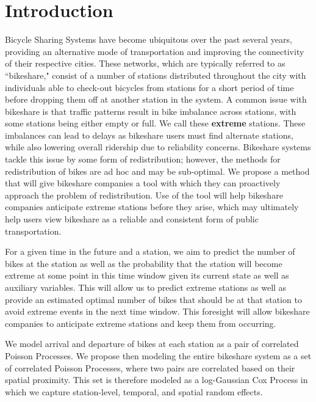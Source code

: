 \documentclass{acm_proc_article-sp}
\begin{document}

\section{Introduction}

Bicycle Sharing Systems have become ubiquitous over the past several years, providing an alternative mode of transportation and improving the connectivity of their respective cities.  These networks, which are typically referred to as ``bikeshare," consist of a number of stations distributed throughout the city with individuals able to check-out bicycles from stations for a short period of time before dropping them off at another station in the system.  A common issue with bikeshare is that traffic patterns result in bike imbalance across stations, with some stations being either empty or full.  We call these {\bf extreme} stations. These imbalances can lead to delays as bikeshare users must find alternate stations, while also lowering overall ridership due to reliability concerns. Bikeshare systems tackle this issue by some form of redistribution; however, the methods for redistribution of bikes are ad hoc and may be sub-optimal. We propose a method that will give bikeshare companies a tool with which they can proactively approach the problem of redistribution. Use of the tool will help bikeshare companies anticipate extreme stations before they arise, which may ultimately help users view bikeshare as a reliable and consistent form of public transportation.

For a given time in the future and a station, we aim to predict the number of bikes at the station as well as the probability that the station will become extreme at some point in this time window given its current state as well as auxiliary variables.  This will allow us to predict extreme stations as well as provide an estimated optimal number of bikes that should be at that station to avoid extreme events in the next time window. This foresight will allow bikeshare companies to anticipate extreme stations and keep them from occurring.

We model arrival and departure of bikes at each station as a pair of correlated Poisson Processes.  We propose then modeling the entire bikeshare system as a set of correlated Poisson Processes, where two pairs are correlated based on their spatial proximity.  This set is therefore modeled as a log-Gaussian Cox Process in which we capture station-level, temporal, and spatial random effects.  
\end{document}
